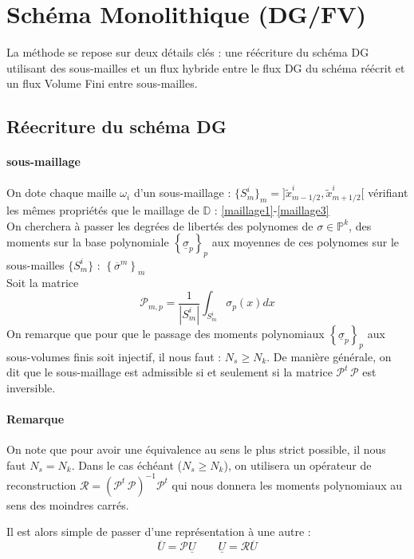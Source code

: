 
\section{Schéma Monolithique (DG/FV)}
La méthode se repose sur deux détails clés : une réécriture du schéma DG utilisant des sous-mailles et 
un flux hybride entre le flux DG du schéma réécrit et un flux Volume Fini entre sous-mailles.
\subsection{Réecriture du schéma DG}
\paragraph{sous-maillage \\}

On dote chaque maille $\omega_i$ d'un sous-maillage : $\{S_m^i\}_m = ]\tilde{x}^i_{m-1/2}, \tilde{x}^i_{m+1/2}[$ vérifiant les mêmes propriétés que le maillage de $\mathbb{D}$ : \eqref{maillage1}-\eqref{maillage3}\\
On cherchera à passer les degrées de libertés des polynomes de $ \sigma \in\mathbb{P}^k$, des moments sur la base polynomiale $ \left\{ \underline{\sigma}_p \right\}_p$ aux moyennes de ces polynomes sur le sous-mailles $\{S_m^i \}$ : $ \left\{\overline{\sigma}^m \right\}_m$ \\
\noindent Soit la matrice $$\mathcal{P}_{m,p} = \frac{1}{|S_m^i|} \int_{S_m^i} \sigma_p(x) dx$$ 
On remarque que pour que le passage des moments polynomiaux $\left\{ \underline{\sigma}_p \right\}_p$ aux sous-volumes finis soit injectif, il nous faut : $N_s \geq N_k$. 
De manière générale, on dit que le sous-maillage est admissible si et seulement si la matrice $\mathcal{P}^t\,\mathcal{P}$ est inversible.

\paragraph{Remarque \\}
On note que pour avoir une équivalence au sens le plus strict possible, il nous faut $N_s = N_k$. 
Dans le cas échéant ($N_s \geq N_k$), on utilisera un opérateur de reconstruction $\mathcal{R} = \left(\mathcal{P}^t\,\mathcal{P}\right)^{-1} \mathcal{P}^t$  qui nous donnera les moments polynomiaux au sens des moindres carrés.
\newline

Il est alors simple de passer d'une représentation à une autre : 
\begin{equation}
    \overline{U} = \mathcal{P}\underline{U} \qquad \underline{U} = \mathcal{R}\overline{U}
\end{equation}

